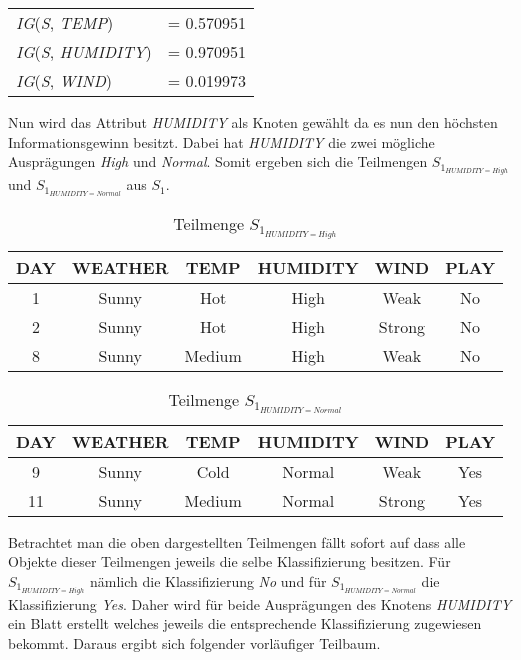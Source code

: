 \begin{table}[htbp]
    \centering
    \begin{tabular}{lc}
        \textit{IG}(\textit{S}, \textit{TEMP})     &= 0.570951 \\
        \textit{IG}(\textit{S}, \textit{HUMIDITY}) &= 0.970951 \\
        \textit{IG}(\textit{S}, \textit{WIND})     &= 0.019973 \\
    \end{tabular}
\end{table}

Nun wird das Attribut \textit{HUMIDITY} als Knoten gewählt da es nun den höchsten Informationsgewinn besitzt. Dabei hat \textit{HUMIDITY} die zwei mögliche Ausprägungen \textit{High} und \textit{Normal}. Somit ergeben sich die Teilmengen $S_{1_{HUMIDITY=High}}$ und $S_{1_{HUMIDITY=Normal}}$ aus $S_{1}$.

\begin{table}[H]
    \centering
    \begin{tabular}{cccccc}
        \toprule
        \textbf{DAY} & \textbf{WEATHER} & \textbf{TEMP} & \textbf{HUMIDITY} & \textbf{WIND} & \textbf{PLAY} \\
        \toprule
        1   &Sunny	&Hot	&High	&Weak	&No  \\
        2   &Sunny	&Hot	&High	&Strong	&No  \\
        8   &Sunny	&Medium	&High	&Weak	&No  \\
        \bottomrule
    \end{tabular}
    \caption{Teilmenge $S_{1_{HUMIDITY=High}}$}
    \label{table:datensatz-humidity-high}
\end{table}
\begin{table}[H]
    \centering
    \begin{tabular}{cccccc}
        \toprule
        \textbf{DAY} & \textbf{WEATHER} & \textbf{TEMP} & \textbf{HUMIDITY} & \textbf{WIND} & \textbf{PLAY} \\
        \toprule
        9   &Sunny	&Cold	&Normal	&Weak	&Yes \\
        11  &Sunny	&Medium	&Normal	&Strong	&Yes \\
        \bottomrule
    \end{tabular}
    \caption{Teilmenge $S_{1_{HUMIDITY=Normal}}$}
    \label{table:datensatz-humidity-normal}
\end{table}

Betrachtet man die oben dargestellten Teilmengen fällt sofort auf dass alle Objekte dieser Teilmengen jeweils die selbe Klassifizierung besitzen. Für $S_{1_{HUMIDITY=High}}$ nämlich die Klassifizierung \textit{No} und für $S_{1_{HUMIDITY=Normal}}$ die Klassifizierung \textit{Yes}. Daher wird für beide Ausprägungen des Knotens \textit{HUMIDITY} ein Blatt erstellt welches jeweils die entsprechende Klassifizierung zugewiesen bekommt. Daraus ergibt sich folgender vorläufiger Teilbaum.

